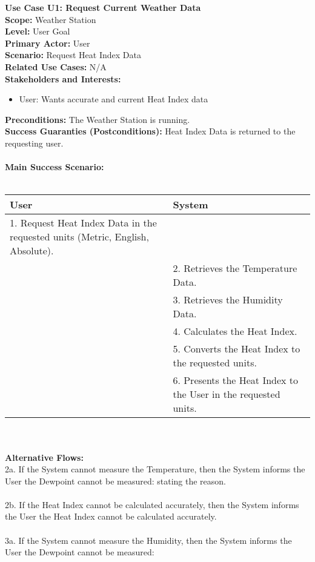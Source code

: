 \documentclass[letterpaper]{article}
\begin{document}
\noindent
\textbf{Use Case U1:  Request Current Weather Data}\\
\textbf{Scope:  }Weather Station\\
\textbf{Level:  }User Goal\\
\textbf{Primary Actor:  }User\\
\textbf{Scenario:  }Request Heat Index Data\\
\textbf{Related Use Cases:  }N/A\\
\textbf{Stakeholders and Interests:}
\begin{itemize}
\item User:  Wants accurate and current Heat Index data
\end{itemize}
\textbf{Preconditions:  }The Weather Station is running.\\
\textbf{Success Guaranties  (Postconditions):} 
Heat Index Data is returned to the requesting user.\\\\
\textbf{Main Success Scenario: }\\\\
\begin{tabular}{|p{6cm}|p{6cm}|}\hline
\textbf{User} & \textbf{System}\\\hline
1.  Request Heat Index Data in the requested units (Metric, English,
Absolute). & \\\hline
&2.  Retrieves the Temperature Data.\\\hline
&3.  Retrieves the Humidity Data.\\\hline
&4.  Calculates the Heat Index.\\\hline
&5.  Converts the Heat Index to the requested units.\\\hline
&6.  Presents the Heat Index to the User in the requested
units.\\\hline
\end{tabular}\\\\
\textbf{Alternative Flows:  }\\
2a.  If the System cannot measure the Temperature,
then the System informs the User the Dewpoint cannot be measured:
stating the reason.\\\\
2b.  If the Heat Index cannot be calculated accurately, then the
System informs the User the Heat Index cannot be calculated
accurately.\\\\ 
3a.  If the System cannot measure the Humidity, then
the System informs the User the Dewpoint cannot be measured:
\end{document}
